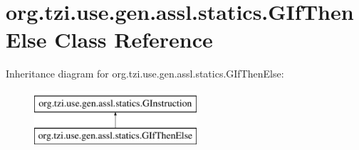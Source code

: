 \hypertarget{classorg_1_1tzi_1_1use_1_1gen_1_1assl_1_1statics_1_1_g_if_then_else}{\section{org.\-tzi.\-use.\-gen.\-assl.\-statics.\-G\-If\-Then\-Else Class Reference}
\label{classorg_1_1tzi_1_1use_1_1gen_1_1assl_1_1statics_1_1_g_if_then_else}
}
Inheritance diagram for org.\-tzi.\-use.\-gen.\-assl.\-statics.\-G\-If\-Then\-Else\-:\begin{figure}[H]
\begin{center}
\leavevmode
\includegraphics[height=2.000000cm]{classorg_1_1tzi_1_1use_1_1gen_1_1assl_1_1statics_1_1_g_if_then_else}
\end{center}
\end{figure}
